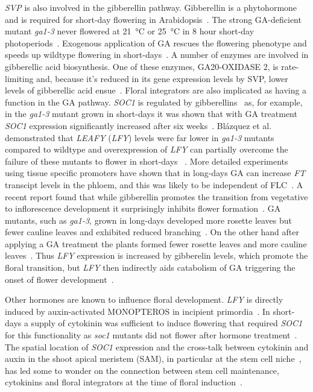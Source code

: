 \emph{SVP} is also involved in the gibberellin pathway.
Gibberellin is a phytohormone and is required for short-day flowering in Arabidopsis~\cite{wilson1992}.
The strong GA-deficient mutant \emph{ga1-3} never flowered at 21~°C or 25~°C in 8 hour short-day photoperiods~\cite{wilson1992}.
Exogenous application of GA rescues the flowering phenotype and speeds up wildtype flowering in short-days~\cite{wilson1992}.
A number of enzymes are involved in gibberellic acid biosynthesis.
One of these enzymes, GA20-OXIDASE 2, is rate-limiting and, because it's reduced in its gene expression levels by SVP, lower levels of gibberellic acid ensue~\cite{andres2014}.
Floral integrators are also implicated as having a function in the GA pathway.
\emph{SOC1} is regulated by gibberellins~\cite{borner2000,moon2003} as, for example, in the \emph{ga1-3} mutant grown in short-days it was shown that with GA treatment \emph{SOC1} expression significantly increased after six weeks~\cite{moon2003}.
Blázquez et al. demonstrated that \emph{LEAFY} (\emph{LFY}) levels were far lower in \emph{ga1-3} mutants compared to wildtype and overexpression of \emph{LFY} can partially overcome the failure of these mutants to flower in short-days ~\cite{blazquez1998}.
More detailed experiments using tissue specific promoters have shown that in long-days GA can increase \emph{FT} transcipt levels in the phloem, and this was likely to be independent of FLC~\cite{porri2012}.
A recent report found that while gibberellin promotes the transition from vegetative to inflorescence development it surprisingly inhibits flower formation~\cite{yamaguchi2014}.
GA mutants, such as \emph{ga1-3}, grown in long-days developed more rosette leaves but fewer cauline leaves and exhibited reduced branching~\cite{yamaguchi2014}.
On the other hand after applying a GA treatment the plants formed fewer rosette leaves and more cauline leaves~\cite{yamaguchi2014}.
Thus \emph{LFY} expression is increased by gibberelin levels, which promote the floral transition, but \emph{LFY} then indirectly aids catabolism of GA triggering the onset of flower development~\cite{yamaguchi2014}.

Other hormones are known to influence floral development.
\emph{LFY} is directly induced by auxin-activated MONOPTEROS in incipient primordia~\cite{yamaguchi2013}.
In short-days a supply of cytokinin was sufficient to induce flowering that required \emph{SOC1} for this functionality as \emph{soc1} mutants did not flower after hormone treatment~\cite{daloia2011}.
The spatial location of \emph{SOC1} expression and the cross-talk between cytokinin and auxin in the shoot apical meristem (SAM), in particular at the stem cell niche~\cite{zhao2010}, has led some to wonder on the connection between stem cell maintenance, cytokinins and floral integrators at the time of floral induction~\cite{bernier2013}.

